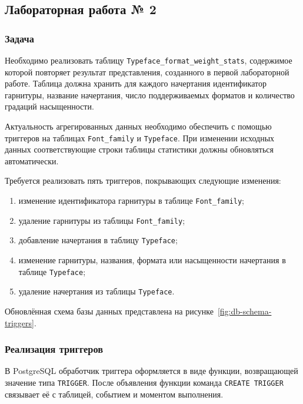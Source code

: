 \subsection{Лабораторная работа № 2}

\subsubsection{Задача}

Необходимо реализовать таблицу
\texttt{Typeface_format_weight_stats}, содержимое которой повторяет
результат представления, созданного в первой лабораторной работе. Таблица
должна хранить для каждого начертания идентификатор гарнитуры, название
начертания, число поддерживаемых форматов и количество градаций насыщенности.

Актуальность агрегированных данных необходимо обеспечить с помощью триггеров
на таблицах \texttt{Font_family} и
\texttt{Typeface}. При изменении исходных данных соответствующие
строки таблицы статистики должны обновляться автоматически.

Требуется реализовать пять триггеров, покрывающих следующие изменения:

\begin{enumerate}
    \item изменение идентификатора гарнитуры в таблице
    \texttt{Font_family};
    \item удаление гарнитуры из таблицы \texttt{Font_family};
    \item добавление начертания в таблицу \texttt{Typeface};
    \item изменение гарнитуры, названия, формата или насыщенности начертания в
    таблице \texttt{Typeface};
    \item удаление начертания из таблицы \texttt{Typeface}.
\end{enumerate}

Обновлённая схема базы данных представлена на
рисунке~\ref{fig:db-schema-triggers}.

\subsubsection{Реализация триггеров}

В PostgreSQL обработчик триггера оформляется в виде функции, возвращающей
значение типа \texttt{TRIGGER}. После объявления функции команда
\texttt{CREATE TRIGGER} связывает её с таблицей, событием и моментом
выполнения.

